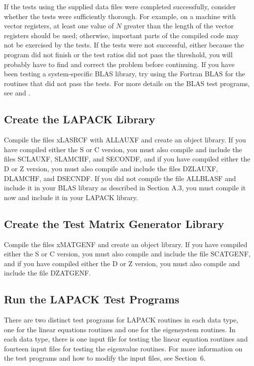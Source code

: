 If the tests using the supplied data files were completed successfully, 
consider whether the tests were sufficiently thorough. 
For example, on a machine with vector registers, at least one value 
of $N$ greater than the length of the vector registers should be used; 
otherwise, important parts of the compiled code may not be 
exercised by the tests. 
If the tests were not successful, either because the program did not
finish or the test ratios did not pass the threshold, you will
probably have to find and correct the problem before continuing. 
If you have been testing a system-specific 
BLAS library, try using the Fortran BLAS for the routines that
did not pass the tests.
For more details on the BLAS test programs,
see \cite{BLAS2-test} and \cite{BLAS3-test}.
 
\subsection{Create the LAPACK Library}

\dent
Compile the files xLASRCF with ALLAUXF and create an object library.
If you have compiled either the S or C version,
you must also compile and include the files
SCLAUXF, SLAMCHF, and SECONDF,
and if you have compiled either the D or Z version,
you must also compile and include the files
DZLAUXF, DLAMCHF, and DSECNDF.
If you did not compile the file ALLBLASF and include it in your BLAS
library as described in Section A.3, you must compile it now
and include it in your LAPACK library.

\subsection{Create the Test Matrix Generator Library}

\dent
Compile the files xMATGENF and create an object library.
If you have compiled either the S or C version,
you must also compile and include the file SCATGENF,
and if you have compiled either the D or Z version,
you must also compile and include the file DZATGENF.

\subsection{Run the LAPACK Test Programs}

\dent
There are two distinct test programs for LAPACK routines
in each data type, one for the linear equations routines and
one for the eigensystem routines.
In each data type, there is one input file for testing the linear
equation routines and fourteen input files for testing the eigenvalue
routines.
For more information on the test programs and how to modify the
input files, see Section~6.

